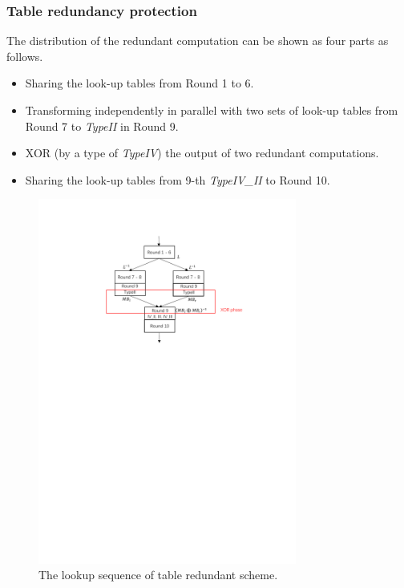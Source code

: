 \documentclass{beamer}
\begin{document}
\frame
{
	\frametitle{Table redundancy protection}
	The distribution of the redundant computation can be shown as four parts as follows.
	\begin{itemize}
		\item Sharing the look-up tables from Round 1 to 6.
		\item Transforming independently in parallel with two sets of look-up tables from Round 7 to \textit{TypeII} in Round 9.
		\item XOR (by a type of \textit{TypeIV}) the output of two redundant computations.
		\item Sharing the look-up tables from 9-th \textit{TypeIV\_II} to Round 10.
	\end{itemize}
}

\frame
{
	\begin{figure}
		\centering
		\includegraphics[width=8.5cm]{./pics/TRS1.pdf}
		\caption{The lookup sequence of table redundant scheme.}
	\end{figure}
}
\end{document}
